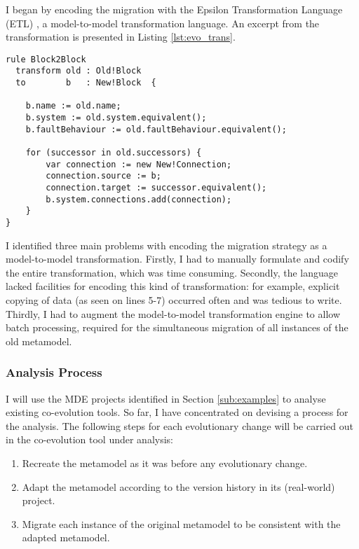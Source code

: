 I began by encoding the migration with the Epsilon Transformation Language (ETL) \cite{kolovos08etl}, a model-to-model transformation language. An excerpt from the transformation is presented in Listing \ref{lst:evo_trans}. 

\begin{lstlisting}[caption=Excerpt from the transformation used to migrate FPTC models., label=lst:evo_trans,language=etl]
rule Block2Block
  transform old : Old!Block
  to        b   : New!Block  {
  
	b.name := old.name;
	b.system := old.system.equivalent();
	b.faultBehaviour := old.faultBehaviour.equivalent();
	
	for (successor in old.successors) {
		var connection := new New!Connection;
		connection.source := b;
		connection.target := successor.equivalent();
		b.system.connections.add(connection);
	}
}
\end{lstlisting}

I identified three main problems with encoding the migration strategy as a model-to-model transformation. Firstly, I had to manually formulate and codify the entire transformation, which was time consuming. Secondly, the language lacked facilities for encoding this kind of transformation: for example, explicit copying of data (as seen on lines 5-7) occurred often and was tedious to write. Thirdly, I had to augment the model-to-model transformation engine to allow batch processing, required for the simultaneous migration of all instances of the old metamodel.


\subsubsection{Analysis Process}
I will use the MDE projects identified in Section \ref{sub:examples} to analyse existing co-evolution tools. So far, I have concentrated on devising a process for the analysis. The following steps for each evolutionary change will be carried out in the co-evolution tool under analysis:

\begin{enumerate}
	\item Recreate the metamodel as it was before any evolutionary change.
	\item Adapt the metamodel according to the version history in its (real-world) project.
	\item Migrate each instance of the original metamodel to be consistent with the adapted metamodel.
\end{enumerate}

